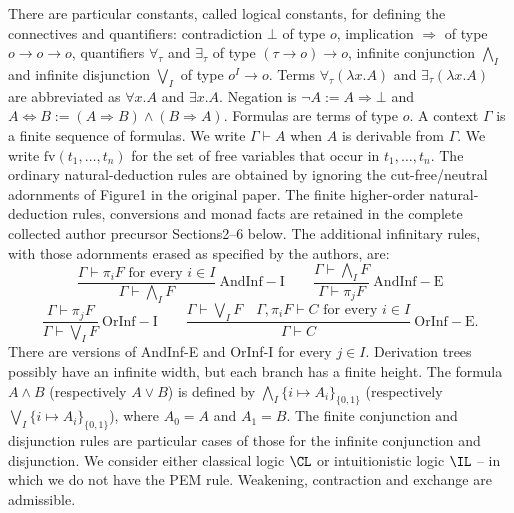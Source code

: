 There are particular constants, called logical constants, for defining the connectives and quantifiers: contradiction $\bot$ of type $o$, implication $\Rightarrow$ of type $o\to o\to o$, quantifiers $\forall_\tau$ and $\exists_\tau$ of type $(\tau\to o)\to o$, infinite conjunction $\bigwedge_I$ and infinite disjunction $\bigvee_I$ of type $o^I\to o$. Terms $\forall_\tau(\lambda x.A)$ and $\exists_\tau(\lambda x.A)$ are abbreviated as $\forall x.A$ and $\exists x.A$. Negation is $\neg A:=A\Rightarrow\bot$ and $A\Leftrightarrow B:=(A\Rightarrow B)\wedge(B\Rightarrow A)$. Formulas are terms of type $o$.
A context $\Gamma$ is a finite sequence of formulas. We write $\Gamma\vdash A$ when $A$ is derivable from $\Gamma$. We write $\mathrm{fv}(t_1,\ldots,t_n)$ for the set of free variables that occur in $t_1,\ldots,t_n$. The ordinary natural-deduction rules are obtained by ignoring the cut-free/neutral adornments of Figure1 in the original paper. The finite higher-order natural-deduction rules, conversions and monad facts are retained in the complete collected author precursor Sections2--6 below. The additional infinitary rules, with those adornments erased as specified by the authors, are:
\[\frac{\Gamma\vdash\pi_iF\text{ for every }i\in I}{\Gamma\vdash\bigwedge_I F}\ \mathrm{AndInf\!\!\!-I}\qquad\frac{\Gamma\vdash\bigwedge_I F}{\Gamma\vdash\pi_jF}\ \mathrm{AndInf\!\!\!-E}\]
\[\frac{\Gamma\vdash\pi_jF}{\Gamma\vdash\bigvee_I F}\ \mathrm{OrInf\!\!\!-I}\qquad\frac{\Gamma\vdash\bigvee_I F\quad\Gamma,\pi_iF\vdash C\text{ for every }i\in I}{\Gamma\vdash C}\ \mathrm{OrInf\!\!\!-E}.\]
There are versions of AndInf-E and OrInf-I for every $j\in I$. Derivation trees possibly have an infinite width, but each branch has a finite height. The formula $A\wedge B$ (respectively $A\vee B$) is defined by $\bigwedge_I\{i\mapsto A_i\}_{\{0,1\}}$ (respectively $\bigvee_I\{i\mapsto A_i\}_{\{0,1\}}$), where $A_0=A$ and $A_1=B$. The finite conjunction and disjunction rules are particular cases of those for the infinite conjunction and disjunction. We consider either classical logic $\CL$ or intuitionistic logic $\IL$ -- in which we do not have the PEM rule. Weakening, contraction and exchange are admissible.

